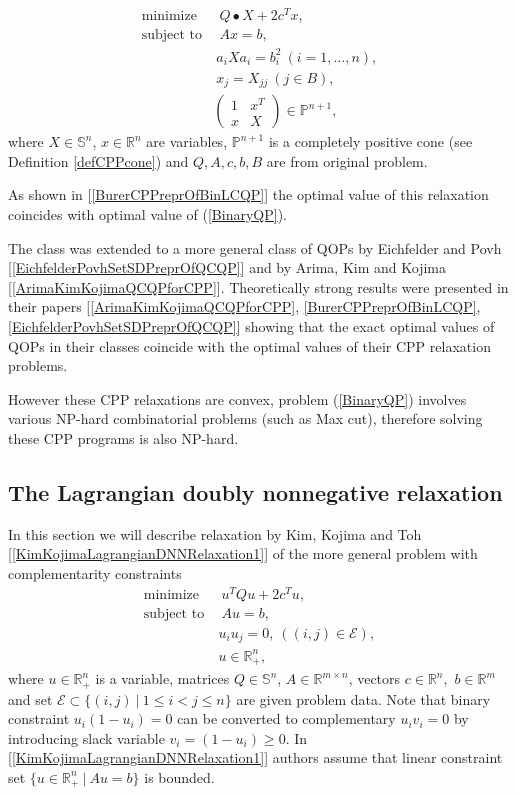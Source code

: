 \documentclass[12pt]{book}
\theoremstyle{definition}
\begin{document}
\begin{equation}
\label{BinaryQP CCP Relaxation}
\begin{array}{ll}
\mbox{minimize}&\ \ Q\bullet X + 2c^Tx ,\\
\mbox{subject to}&\ \ Ax = b,\\
				 & \ a_iXa_i = b_i^2 \ (i=1,\dots ,n), \\
				 & \ x_j = X_{jj} \ (j \in B), \\
				 &\left(\begin{array}{rr} 1 & x^T \\ x & X\end{array}\right) \in \mathbb{P}^{n+1}, 
\end{array}
\end{equation}
where $X\in \mathbb{S}^n$, $x\in\mathbb{R}^n$ are variables, $\mathbb{P}^{n+1}$ is a completely positive cone (see Definition \ref{defCPPcone}) and $Q,A,c,b,B$ are from original problem. 

As shown in [\ref{BurerCPPreprOfBinLCQP}] the optimal value of this relaxation coincides with optimal value of (\ref{BinaryQP}).

The class was extended to a more general class of QOPs by Eichfelder and
Povh [\ref{EichfelderPovhSetSDPreprOfQCQP}] and by Arima, Kim and Kojima [\ref{ArimaKimKojimaQCQPforCPP}]. Theoretically strong results were presented in
their papers [\ref{ArimaKimKojimaQCQPforCPP}, \ref{BurerCPPreprOfBinLCQP}, \ref{EichfelderPovhSetSDPreprOfQCQP}] showing that the exact optimal values of QOPs in their classes coincide
with the optimal values of their CPP relaxation problems.

However these CPP relaxations are convex, problem (\ref{BinaryQP}) involves various NP-hard combinatorial problems (such as Max cut), therefore solving these CPP programs is also NP-hard. 

\subsection{The Lagrangian doubly nonnegative relaxation}
In this section we will describe relaxation by Kim, Kojima and Toh [\ref{KimKojimaLagrangianDNNRelaxation1}] of the more general problem with complementarity constraints
\begin{equation}
\label{BinaryQP2}
\begin{array}{ll}
\mbox{minimize}&\ \ u^TQu + 2c^Tu ,\\
\mbox{subject to}&\ \ Au = b,\\
				 & \ u_iu_j = 0, \ ((i,j)\in \mathcal{E}), \\
				 &\ u\in \mathbb{R}^n_+, 
\end{array}
\end{equation}
where $u\in\mathbb{R}^n_+$ is a variable, matrices $Q\in\mathbb{S}^n$, $A\in \mathbb{R}^{m\times n}$, vectors $c\in\mathbb{R}^n,$ $b\in\mathbb{R}^m$ and set $\mathcal{E}\subset \{(i,j)\ \vert \ 1\leq i< j\leq n\}$ are given problem data. Note that binary constraint $u_i(1-u_i) = 0$ can be converted to complementary $u_iv_i = 0$ by introducing slack variable $v_i = (1-u_i)\geq 0.$ In [\ref{KimKojimaLagrangianDNNRelaxation1}] authors assume that linear constraint set
$\{ u\in\mathbb{R}^n_+ \ \vert \ Au = b \}$ is bounded.
\end{document}
